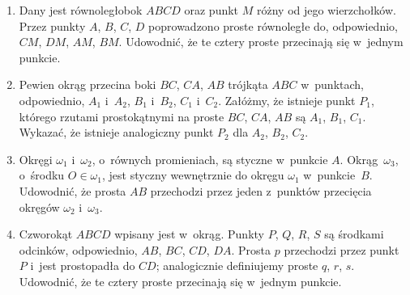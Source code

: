 \begin{enumerate}[widest=1,itemsep=0pt]
\item Dany jest równoległobok $ABCD$ oraz punkt $M$ różny od jego wierzchołków. Przez punkty $A$, $B$, $C$, $D$ poprowadzono proste równoległe do, odpowiednio, $CM$, $DM$, $AM$, $BM$. Udowodnić, że te cztery proste przecinają się w~jednym punkcie.
\item Pewien okrąg przecina boki $BC$, $CA$, $AB$ trójkąta $ABC$ w~punktach, odpowiednio, $A_1$ i~$A_2$, $B_1$ i~$B_2$, $C_1$ i~$C_2$. Załóżmy, że istnieje punkt $P_1$, którego rzutami prostokątnymi na proste $BC$, $CA$, $AB$ są $A_1$, $B_1$, $C_1$. Wykazać, że istnieje analogiczny punkt $P_2$ dla $A_2$, $B_2$, $C_2$.
\item Okręgi $\omega_1$ i~$\omega_2$, o~równych promieniach, są styczne w~punkcie $A$. Okrąg~$\omega_3$, o~środku $O\in\omega_1$, jest styczny wewnętrznie do okręgu $\omega_1$ w~punkcie~$B$. Udowodnić, że prosta $AB$ przechodzi przez jeden z~punktów przecięcia okręgów $\omega_2$ i~$\omega_3$.
\item Czworokąt $ABCD$ wpisany jest w~okrąg. Punkty $P$, $Q$, $R$, $S$ są środkami odcinków, odpowiednio, $AB$, $BC$, $CD$, $DA$. Prosta $p$ przechodzi przez punkt $P$ i~jest prostopadła do $CD$; analogicznie definiujemy proste $q$, $r$, $s$. Udowodnić, że te cztery proste przecinają się w~jednym punkcie.

\end{enumerate}



\eject